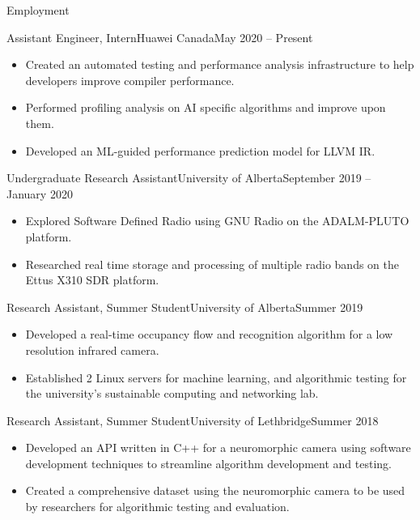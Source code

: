 \documentclass[]{mcdowellcv}
\begin{document}
\begin{cvsection}{Employment}
   \begin{cvsubsection}{Assistant Engineer, Intern}{Huawei Canada}{May 2020 -- Present}
    \vspace*{5pt}
    \begin{itemize}
      \item Created an automated testing and performance analysis infrastructure to help developers improve compiler performance.
      \item Performed profiling analysis on AI specific algorithms and improve upon them.
      \item Developed an ML-guided performance prediction model for LLVM IR.
    \end{itemize}

  \end{cvsubsection}
  
  \begin{cvsubsection}{Undergraduate Research Assistant}{University of Alberta}{September 2019 -- January 2020}
    \vspace*{5pt}
    \begin{itemize}
      \item Explored Software Defined Radio using GNU Radio on the ADALM-PLUTO platform.
      \item Researched real time storage and processing of multiple radio bands on the Ettus X310 SDR platform.
    \end{itemize}

  \end{cvsubsection}
  \begin{cvsubsection}{Research Assistant, Summer Student}{University of Alberta}{Summer 2019}
    \vspace*{5pt}		
    \begin{itemize}
      \item Developed a real-time occupancy flow and recognition algorithm for a low resolution infrared camera.
      \item Established 2 Linux servers for machine learning, and algorithmic testing for the university's sustainable computing and networking lab.
    \end{itemize}
  \end{cvsubsection}
  \begin{cvsubsection}{Research Assistant, Summer Student}{University of Lethbridge}{Summer 2018}	
    \vspace*{5pt}
    \begin{itemize}
      \item Developed an API written in C++ for a neuromorphic camera using software development techniques to streamline algorithm development and testing.
      \item Created a comprehensive dataset using the neuromorphic camera to be used by researchers for algorithmic testing and evaluation.
    \end{itemize}
  \end{cvsubsection}
\end{cvsection}
\end{document}
